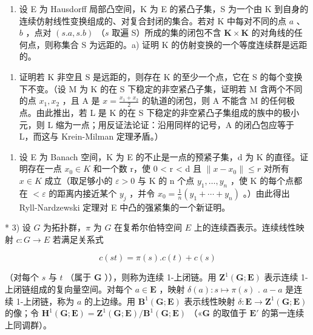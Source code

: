 \exerciseappendix

\begin{enumerate}
\def\labelenumi{\arabic{enumi})}
\tightlist
\item
  设 E 为 Hausdorff 局部凸空间，K 为 E 的紧凸子集，S 为一个由 K 到自身的连续仿射线性变换组成的、对复合封闭的集合。若对 K 中每对不同的点 \(a\) 、 \(b\) ，点对 \((s.a,s.b)\) （\(s\) 取遍 S）所成的集的闭包不含 \(\mathbf{K} \times \mathbf{K}\) 的对角线的任何点，则称集合 S 为远距的。a) 证明 K 的仿射变换的一个等度连续群是远距的。
\end{enumerate}

\begin{enumerate}
\def\labelenumi{\alph{enumi})}
\setcounter{enumi}{1}
\tightlist
\item
  证明若 K 非空且 S 是远距的，则存在 K 的至少一个点，它在 S 的每个变换下不变。（设 M 为 K 的在 S 下稳定的非空紧凸子集，证明若 M 含两个不同的点 \(x_{1}, x_{2}\) ，且 A 是 \(x = \frac{x_{1} + x_{2}}{2}\) 的轨道的闭包，则 A 不能含 M 的任何极点。由此推出，若 L 是 K 的在 S 下稳定的非空紧凸子集组成的族中的极小元，则 L 缩为一点；用反证法论证：沿用同样的记号，A 的闭凸包应等于 L，而这与 Krein-Milman 定理矛盾。）
\end{enumerate}

\begin{enumerate}
\def\labelenumi{\arabic{enumi})}
\setcounter{enumi}{1}
\tightlist
\item
  设 E 为 Banach 空间，K 为 E 的不止是一点的预紧子集，d 为 K 的直径。证明存在一点 \(x_{0} \in K\) 和一个数 r，使 0 \textless{} r \textless{} d 且 \(\|x - x_{0}\| \leqslant r\) 对所有 \(x \in K\) 成立（取足够小的 \(\varepsilon > 0\) 与 K 的 n 个点 \(y_{1}, \ldots, y_{n}\) ，使 K 的每个点都在 \(<\varepsilon\) 的距离内接近某个 \(y_{j}\) ，并令 \(x_{0} = \frac{1}{n}(y_{1} + \cdots + y_{n})\) 。）由此得出 Ryll-Nardzewski 定理对 E 中凸的强紧集的一个新证明。
\end{enumerate}

* 3) 设 \(G\) 为拓扑群，\(\pi\) 为 \(G\) 在复希尔伯特空间 \(E\) 上的连续酉表示。连续线性映射 \(c: G \to E\) 若满足关系式

\[
c (s t) = \pi (s). c (t) + c (s)
\]

（对每个 \(s\) 与 \(t\) （属于 \(\mathbf{G}\) ）），则称为连续 1-上闭链。用 \(\mathbf{Z}^{1}(\mathbf{G};\mathbf{E})\) 表示连续 1-上闭链组成的复向量空间。对每个 \(a\in\mathbf{E}\) ，映射 \(\delta(a):s\mapsto\pi(s)\) . \(a-a\) 是连续 1-上闭链，称为 \(a\) 的上边缘。用 \(\mathbf{B}^{1}(\mathbf{G};\mathbf{E})\) 表示线性映射 \(\delta:\mathbf{E}\to\mathbf{Z}^{1}(\mathbf{G};\mathbf{E})\) 的像；令 \(\mathbf{H}^{1}(\mathbf{G};\mathbf{E})=\mathbf{Z}^{1}(\mathbf{G};\mathbf{E})/\mathbf{B}^{1}(\mathbf{G};\mathbf{E})\) （«\(\mathbf{G}\) 的取值于 \(\mathbf{E}'\) 的第一连续上同调群）。

